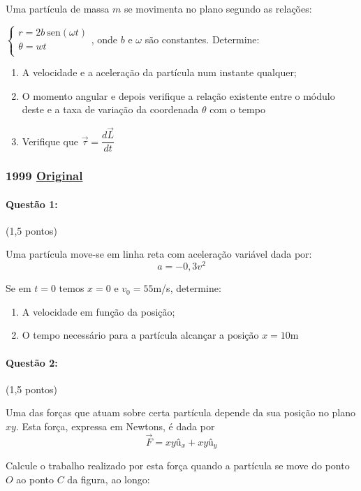 \documentclass[12pt,a4paper]{article}
\newcommand{\sen}{\mathrm{sen}}
\newcommand{\original}[1]{\tiny \href{#1}{Original} \normalsize}
\begin{document}
Uma partícula de massa $m$ se movimenta no plano segundo as relações:


$
\begin{cases}
r=2b \ \sen (\omega t)\\
\theta = wt \\
\end{cases}
$, onde $b$ e $\omega$ são constantes.
\vspace{0.5cm}
Determine:
\begin{enumerate}[label=\alph*)]
\item A velocidade e a aceleração da partícula num instante qualquer;
\item O momento angular e depois verifique a relação existente entre o módulo deste e a taxa de variação da coordenada $\theta$ com o tempo
\item Verifique que $\overrightarrow{\tau} = \dfrac{d\overrightarrow{L}}{dt} $
\end{enumerate}
\newpage

\subsubsection{1999 \original{https://drive.google.com/file/d/1k_gY1BbPEzPreiuaKeLreQ0r2AXyRHKL/view?usp=sharing}}

\paragraph{Questão 1:} (1,5 pontos)

Uma partícula move-se em linha reta com aceleração variável dada por:
$$ a = -0,3v^2 $$

Se em $t=0$ temos $x=0$ e $v_0=55$m/s, determine:
\begin{enumerate}[label=\alph*)]
\item A velocidade em função da posição;
\item O tempo necessário para a partícula alcançar a posição $x=10$m
\end{enumerate}

\paragraph{Questão 2:} (1,5 pontos)

Uma das forças que atuam sobre certa partícula depende da sua posição no plano $xy$. Esta força, expressa em Newtons, é dada por
$$ \overrightarrow{F}=xy \textrm{û}_x + xy \textrm{û}_y$$

Calcule o trabalho realizado por esta força quando a partícula se move do ponto $O$ ao ponto $C$ da figura, ao longo:
\end{document}
